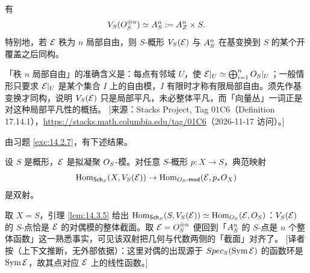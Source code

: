 \begin{example}\label{ex:14.3.4}
有
\[
V_S(O_S^{\oplus n})\simeq A^n_S:=A^n_Z\times S.
\]
特别地，若 $\mathcal{E}$ 秩为 $n$ 局部自由，则 $S$-概形 $V_S(\mathcal{E})$ 与 $A^n_S$ 在基变换到 $S$ 的某个开覆盖之后同构。
\end{example}

\begin{yizhu}
「秩 $n$ 局部自由」的准确含义是：每点有邻域 $U$，使 $\mathcal{E}|_U\simeq\bigoplus_{i=1}^nO_S|_U$；一般情形只要求 $\mathcal{E}|_U$ 是某个集合 $I$ 上的自由模，$I$ 有限时才称有限局部自由。须先作基变换才同构，说明 $V_S(\mathcal{E})$ 只是局部平凡，未必整体平凡，而「向量丛」一词正是对这种局部平凡性的概括。
[来源：Stacks Project, Tag 01C6（Definition 17.14.1），\url{https://stacks.math.columbia.edu/tag/01C6}（2026-11-17 访问）。]
\end{yizhu}

由习题 \ref{exc:14.2.7}，有下述结果。

\begin{lemma}\label{lem:14.3.5}
设 $S$ 是概形，$\mathcal{E}$ 是拟凝聚 $O_S$-模。对任意 $S$-概形 $p\colon X\to S$，典范映射
\[
\operatorname{Hom}_{\mathsf{Sch}_S}(X,V_S(\mathcal{E}))\to\operatorname{Hom}_{O_S\text{-}\mathsf{mod}}(\mathcal{E},p_*O_X)
\]
是双射。
\end{lemma}

\begin{yizhu}
取 $X=S$，引理 \ref{lem:14.3.5} 给出 $\operatorname{Hom}_{\mathsf{Sch}_S}(S,V_S(\mathcal{E}))\simeq\operatorname{Hom}_{O_S}(\mathcal{E},O_S)$：$V_S(\mathcal{E})$ 的 $S$-点恰是 $\mathcal{E}$ 的对偶模的整体截面。取 $\mathcal{E}=O_S^{\oplus n}$ 便回到「$A^n_S$ 的 $S$-点是 $n$ 个整体函数」这一熟悉事实，可见该双射把几何与代数两侧的「截面」对齐了。
[译者按（上下文推断，无外部依据）：这里对偶的出现源于 $Spec_S(\mathrm{Sym}\,\mathcal{E})$ 的函数环是 $\mathrm{Sym}\,\mathcal{E}$，故其点对应 $\mathcal{E}$ 上的线性函数。]
\end{yizhu}
